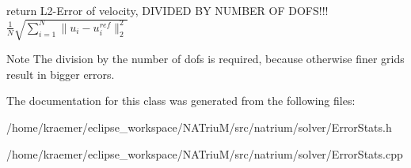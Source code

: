 return L2-\/\-Error of velocity, D\-I\-V\-I\-D\-E\-D B\-Y N\-U\-M\-B\-E\-R O\-F D\-O\-F\-S!!! $ \frac{1}{N} \sqrt{ \sum_{i=1}^{N} \|u_{i} - u_{i}^{ref}\|_{2}^{2} } $ 

\begin{DoxyNote}{Note}
The division by the number of dofs is required, because otherwise finer grids result in bigger errors. 
\end{DoxyNote}


The documentation for this class was generated from the following files\-:\begin{DoxyCompactItemize}
\item 
/home/kraemer/eclipse\-\_\-workspace/\-N\-A\-Triu\-M/src/natrium/solver/Error\-Stats.\-h\item 
/home/kraemer/eclipse\-\_\-workspace/\-N\-A\-Triu\-M/src/natrium/solver/Error\-Stats.\-cpp\end{DoxyCompactItemize}

